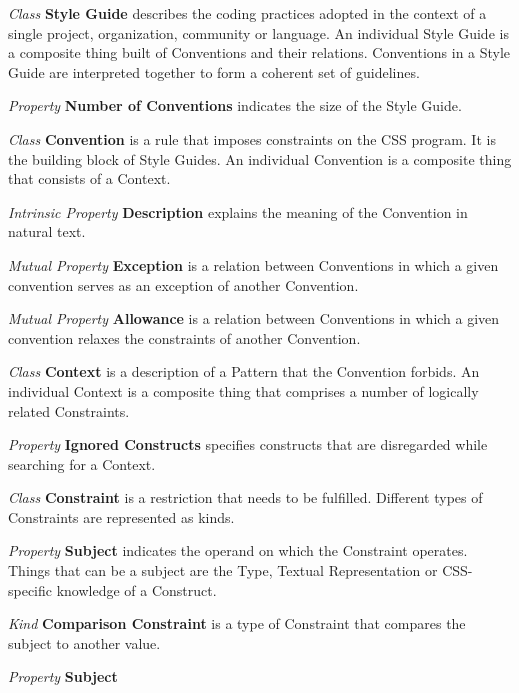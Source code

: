 \documentclass[parskip=full]{uvamscse}
\begin{document}
\begin{description}

\item\textit{Class} \textbf{Style Guide} describes the coding practices adopted in the context of a single project, organization, community or language. An individual Style Guide is a composite thing built of Conventions and their relations. Conventions in a Style Guide are interpreted together to form a coherent set of guidelines.

\textit{Property} \textbf{Number of Conventions} indicates the size of the Style Guide.


\item\textit{Class} \textbf{Convention} is a rule that imposes constraints on the CSS program. It is the building block of Style Guides. An individual Convention is a composite thing that consists of a Context.

\textit{Intrinsic Property} \textbf{Description} explains the meaning of the Convention in natural text.

\textit{Mutual Property} \textbf{Exception} is a relation between Conventions in which a given convention serves as an exception of another Convention.

\textit{Mutual Property} \textbf{Allowance} is a relation between Conventions in which a given convention relaxes the constraints of another Convention. 


\item\textit{Class} \textbf{Context} is a description of a Pattern that the Convention forbids. An individual Context is a composite thing that comprises a number of logically related Constraints.

\textit{Property} \textbf{Ignored Constructs} specifies constructs that are disregarded while searching for a Context.


\item\textit{Class} \textbf{Constraint} is a restriction that needs to be fulfilled. Different types of Constraints are represented as kinds.

\textit{Property} \textbf{Subject} indicates the operand on which the Constraint operates. Things that can be a subject are the Type, Textual Representation or CSS-specific knowledge of a Construct.


\item\textit{Kind} \textbf{Comparison Constraint} is a type of Constraint that compares the subject to another value.

\textit{Property} \textbf{Subject} 


\end{description}
\end{document}
